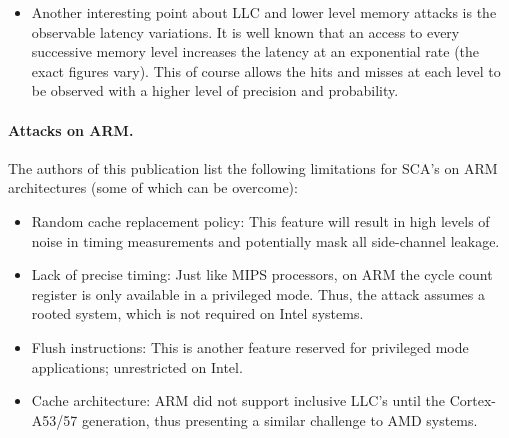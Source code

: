 \begin{itemize}
		\item Another interesting point about LLC and lower level memory attacks is the observable latency variations. It is well known that an access to every successive memory level increases the latency at an exponential rate (the exact figures vary). This of course allows the hits and misses at each level to be observed with a higher level of precision and probability. 
	\end{itemize}
	
	\paragraph{Attacks on ARM.} The authors of this publication list the following limitations for SCA's on ARM architectures (some of which can be overcome):
	\begin{itemize}
		\item Random cache replacement policy: This feature will result in high levels of noise in timing measurements and potentially mask all side-channel leakage.
		\item Lack of precise timing: Just like MIPS processors, on ARM the cycle count register is only available in a privileged mode. Thus, the attack assumes a rooted system, which is not required on Intel systems.
		\item Flush instructions: This is another feature reserved for privileged mode applications; unrestricted on Intel.
		\item Cache architecture: ARM did not support inclusive LLC's until the Cortex-A53/57 generation, thus presenting a similar challenge to AMD systems.
	\end{itemize}
